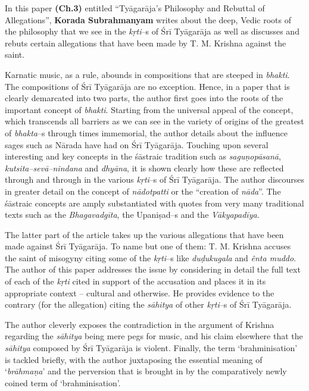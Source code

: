 In this paper \textbf{(Ch.3)} entitled “Tyāgarāja’s Philosophy and Rebuttal of Allegations”, \textbf{Korada Subrahmanyam} writes about the deep, Vedic roots of the philosophy that we see in the \textit{kṛti}–s of Śrī Tyāgarāja as well as discusses and rebuts certain allegations that have been made by T. M. Krishna against the saint.

Karnatic music, as a rule, abounds in compositions that are steeped in \textit{bhakti}. The compositions of Śrī Tyāgarāja are no exception. Hence, in a paper that is clearly demarcated into two parts, the author first goes into the roots of the important concept of \textit{bhakti}. Starting from the universal appeal of the concept, which transcends all barriers as we can see in the variety of origins of the greatest of \textit{bhakta}–s through times immemorial, the author details about the influence sages such as Nārada have had on Śrī Tyāgarāja. Touching upon several interesting and key concepts in the śāstraic tradition such as \textit{saguṇopāsanā}, \textit{kutsita–sevā–nindana} and \textit{dhyāna}, it is shown clearly how these are reflected through and through in the various \textit{kṛti}–s of Śrī Tyāgarāja. The author discourses in greater detail on the concept of \textit{nādotpatti} or the “creation of \textit{nāda}”. The śāstraic concepts are amply substantiated with quotes from very many traditional texts such as the \textit{Bhagavadgīta}, the Upaniṣad–s and the \textit{Vākyapadīya}.

The latter part of the article takes up the various allegations that have been made against Śrī Tyāgarāja. To name but one of them: T. M. Krishna accuses the saint of misogyny citing some of the \textit{kṛti}–s like \textit{duḍukugala} and \textit{ênta muddo}. The author of this paper addresses the issue by considering in detail the full text of each of the \textit{kṛti} cited in support of the accusation and places it in its appropriate context – cultural and otherwise. He provides evidence to the contrary (for the allegation) citing the \textit{sāhitya} of other \textit{kṛti}–s of Śrī Tyāgarāja.

The author cleverly exposes the contradiction in the argument of Krishna regarding the \textit{sāhitya} being mere pegs for music, and his claim elsewhere that the \textit{sāhitya} composed by Śrī Tyāgarāja is violent. Finally, the term ‘brahminisation’ is tackled briefly, with the author juxtaposing the essential meaning of ‘\textit{brāhmaṇa}’ and the perversion that is brought in by the comparatively newly coined term of ‘brahminisation’.


